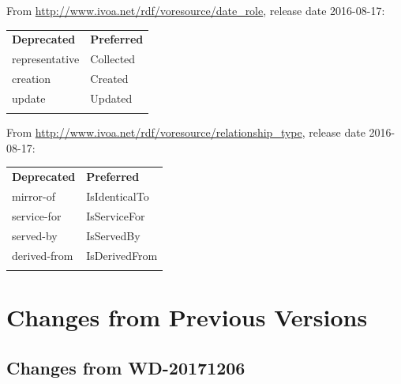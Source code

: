 \documentclass[11pt,a4paper]{ivoa}
\begin{document}
From \url{http://www.ivoa.net/rdf/voresource/date_role},
release date 2016-08-17:

\begin{inlinetable}
\begin{tabular}{ll}
\sptablerule
\textbf{Deprecated}&\textbf{Preferred}\\
\sptablerule
representative&Collected\\
creation&Created\\
update&Updated\\
\sptablerule
\end{tabular}
\end{inlinetable}

From 
\url{http://www.ivoa.net/rdf/voresource/relationship_type}, release date
2016-08-17:

\begin{inlinetable}
\begin{tabular}{ll}
\sptablerule
\textbf{Deprecated}&\textbf{Preferred}\\
\sptablerule
mirror-of&IsIdenticalTo\\
service-for&IsServiceFor\\
served-by&IsServedBy\\
derived-from&IsDerivedFrom\\
\sptablerule
\end{tabular}
\end{inlinetable}

\section{Changes from Previous Versions}

\label{changes}

\subsection{Changes from WD-20171206}
\end{document}
